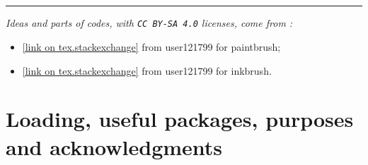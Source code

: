 \documentclass[11pt,a4paper]{ltxdoc}
\begin{document}
\begin{tcolorbox}[colframe=lightgray,colback=lightgray!5]
\hfill{}\hfill~
\end{tcolorbox}

\begin{tcolorbox}[colframe=lightgray,colback=lightgray!5]
\hfill{}
\end{tcolorbox}

\begin{tcolorbox}[colframe=lightgray,colback=lightgray!5]
\hfill{}~~\hfill~
\end{tcolorbox}

\begin{tcolorbox}[colframe=lightgray,colback=lightgray!5]
\hfill{}\hfill~
\end{tcolorbox}

\vfill~

\hrule

\vspace*{5mm}

\textit{Ideas and parts of codes, with \texttt{CC\,BY-SA\,4.0} licenses, come from :}

\begin{itemize}
	\item \href{https://tex.stackexchange.com/questions/475141/simulating-paintbrush-strokes-in-tikz}{[link on tex.stackexchange]} from \textsf{user121799} for paintbrush;
	\item \href{https://tex.stackexchange.com/questions/460836/custom-line-cap-to-simulate-inked-line-in-tikz/460842#460842}{[link on tex.stackexchange]} from \textsf{user121799} for inkbrush.
\end{itemize}

\pagebreak


\hypertarget{matoc}{}

\tableofcontents

\vspace*{5mm}


\pagebreak

\section{Loading, useful packages, purposes and acknowledgments}
\end{document}
